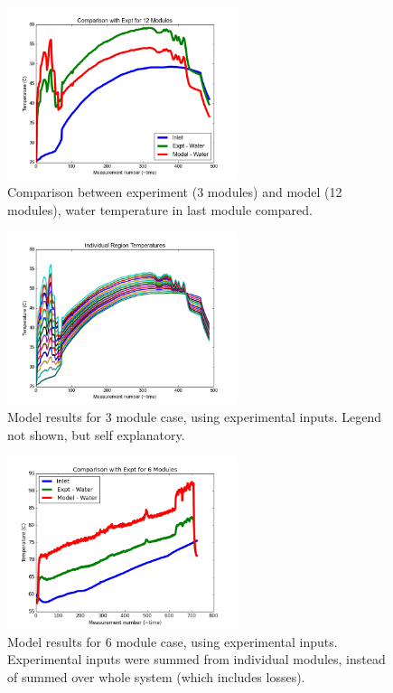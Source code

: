 \documentclass[11pt]{article}
\begin{document}
\begin{figure}[!ht]
\centering
\includegraphics[width=0.6\textwidth]{nov25_12.png}
\caption{Comparison between experiment (3 modules) and model (12 modules), water temperature in last module compared.}
\end{figure}
\begin{figure}[!ht]
\centering
\includegraphics[width=0.6\textwidth]{nov25modules_12.png}
\caption{Model results for 3 module case, using experimental inputs. Legend not shown, but self explanatory.}
\end{figure}

\begin{figure}[!ht]
	\centering
	\includegraphics[width=0.6\textwidth]{Feb11.png}
	\caption{Model results for 6 module case, using experimental inputs. Experimental inputs were summed from individual modules, instead of summed over whole system (which includes losses).}
\end{figure}
\end{document}
